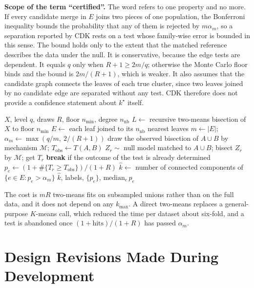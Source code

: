 \documentclass[runningheads]{llncs}
\begin{document}
\medskip\noindent\textbf{Scope of the term ``certified''.} The word refers to
one property and no more. If every candidate merge in $E$ joins two pieces of
one population, the Bonferroni inequality bounds the probability that any of
them is rejected by $m\alpha_m$, so a separation reported by CDK rests on a
test whose family-wise error is bounded in this sense. The bound holds only to
the extent that the matched reference describes the data under the null. It is
conservative, because the edge tests are dependent. It equals $q$ only when
$R+1 \ge 2m/q$; otherwise the Monte Carlo floor binds and the bound is
$2m/(R+1)$, which is weaker. It also assumes that the candidate graph connects
the leaves of each true cluster, since two leaves joined by no candidate edge
are separated without any test. CDK therefore does not provide a confidence
statement about $k^\star$ itself.

\begin{algorithm}[!htbp]
\caption{CDK}
\label{alg:cdk}
\begin{algorithmic}[1]
\Require $X$, level $q$, draws $R$, floor $n_{\min}$, degree $n_{\text{nb}}$
\State $L \gets$ recursive two-means bisection of $X$ to floor $n_{\min}$
\State $E \gets$ each leaf joined to its $n_{\text{nb}}$ nearest leaves
\State $m \gets |E|$; \ $\alpha_m \gets \max(q/m,\ 2/(R+1))$
  \State draw the observed bisection of $A \cup B$ by mechanism $\mathcal{M}$;
         $T_{\text{obs}} \gets T(A,B)$
    \State $Z_r \sim$ null model matched to $A \cup B$; bisect $Z_r$ by
           $\mathcal{M}$; get $T_r$
    \State \textbf{break} if the outcome of the test is already determined
  \EndFor
  \State $p_e \gets (1 + \#\{T_r \ge T_{\text{obs}}\}) / (1 + R)$
\EndFor
\State $\hat k \gets$ number of connected components of
       $\{e \in E : p_e > \alpha_m\}$
\State \Return $\hat k$, labels, $\{p_e\}$, $\mathrm{median}_e\, p_e$
\end{algorithmic}
\end{algorithm}

The cost is $m R$ two-means fits on subsampled unions rather than on the full
data, and it does not depend on any $k_{\max}$. A direct two-means
replaces a general-purpose $K$-means call, which reduced the time per dataset
about six-fold, and a test is abandoned once $(1 + \text{hits})/(1 + R)$ has
passed $\alpha_m$.

\section{Design Revisions Made During Development}
\label{sec:corrections}
\end{document}

